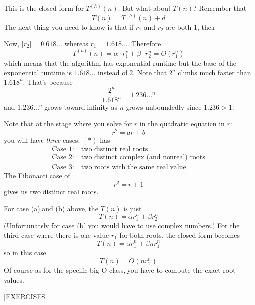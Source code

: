 This is the closed form for $T^{(h)}(n)$.
But what about $T(n)$? Remember that
\[
T(n) = T^{(h)}(n) + d
\]
The next thing you need to know is that
if $r_1$ and $r_2$ are both $1$, then
\[
\]

Now, $|r_2| = 0.618...$ whereas $r_1 = 1.618...$.
Therefore
\[
T^{(h)}(n) = \alpha \cdot r_1^n + \beta \cdot r_2^n = O(r_1^n)
\]
which means that the algorithm has exponential runtime
but the base of the exponential runtime is $1.618...$ instead of $2$.
Note that $2^n$ climbs much faster than $1.618^n$.
That's because
\[
\frac{2^n}{1.618^n} = 1.236...^n
\]
and $1.236...^n$ grows toward infinity as $n$ grows unboundedly
since $1.236 > 1$.

Note that at the stage where you solve for $r$ in 
the quadratic equation in $r$:
\[
r^2 = ar + b \tag{*}
\]
you will have \textit{three} cases: $(*)$ has
\begin{align*}
\text{Case 1:} & \ \text{two distinct real roots} \\
\text{Case 2:} & \ \text{two distinct complex (and nonreal) roots} \\
\text{Case 3:} & \ \text{two roots with the same real value}
\end{align*}
The Fibonacci case of 
\[
r^2 = r + 1
\]
gives us two distinct real roots.

For case (a) and (b) above, the $T(n)$ is just
\[
T(n) = \alpha r_1^n + \beta r_2^n
\]
(Unfortunately for case (b) you would have to use complex
numbers.)
For the third case where there is one value $r_1$ for both roots,
the closed form becomes
\[
T(n) = \alpha r_1^n + \beta nr_1^n
\]
so in this case
\[
T(n) = O(nr_1^n)
\]
Of course as for the specific big-O class, you have to 
compute the exact root values.

[EXERCISES]

%
